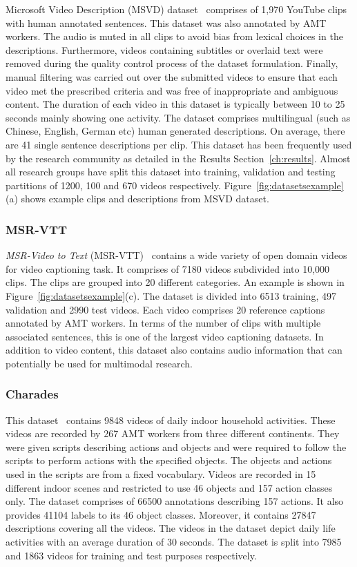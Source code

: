 \documentclass[10pt,journal,compsoc]{IEEEtran}
\begin{document}
Microsoft Video Description (MSVD) dataset~\cite{chen2011collecting} comprises of 1,970 YouTube clips with human annotated sentences. This dataset was also annotated by AMT workers. The audio is muted in all clips to avoid bias from lexical choices in the descriptions.  Furthermore, videos containing subtitles or overlaid text were removed during the quality control process of the dataset formulation. Finally, manual filtering was carried out over the submitted videos to ensure that each video met the prescribed criteria and was free of inappropriate and ambiguous content. The duration of each video in this dataset is typically between 10 to 25 seconds mainly showing one activity. The dataset comprises multilingual (such as Chinese, English, German etc) human generated descriptions. On average, there are 41 single sentence descriptions per clip. This dataset has been frequently used by the research community as detailed in the Results Section~\ref{ch:results}. Almost all research groups have split this dataset into training, validation and testing partitions of 1200, 100 and 670 videos respectively. Figure~\ref{fig:datasetsexample}(a) shows example clips and descriptions from MSVD dataset.

\subsubsection{MSR-VTT} 
\textit{MSR-Video to Text} (MSR-VTT)~\cite{xu2016msr} contains a wide variety of open domain videos for video captioning task. It comprises of 7180 videos subdivided into 10,000 clips. The clips are grouped into 20 different categories. An example is shown in Figure~\ref{fig:datasetsexample}(c). The dataset is divided into 6513 training, 497 validation and 2990 test videos. Each video comprises 20 reference captions annotated by AMT workers. In terms of the number of clips with multiple associated sentences, this is one of the largest video captioning datasets. In addition to video content, this dataset also contains audio information that can potentially be used for multimodal research. 

\subsubsection{Charades}
This dataset~\cite{sigurdsson2016hollywood} contains 9848 videos of daily indoor household activities. These videos are recorded by 267 AMT workers from three different continents. They were given scripts describing actions and objects and were required to follow the scripts to perform actions with the specified objects. The objects and actions used in the scripts are from a fixed vocabulary. Videos are recorded in 15 different indoor scenes and restricted to use 46 objects and 157 action classes only. The dataset comprises of 66500 annotations describing 157 actions. It also provides 41104 labels to its 46 object classes. Moreover, it contains 27847 descriptions covering all the videos. The videos in the dataset depict daily life activities with an average duration of 30 seconds. The dataset is split into 7985 and 1863 videos for training and test purposes respectively.
\end{document}

